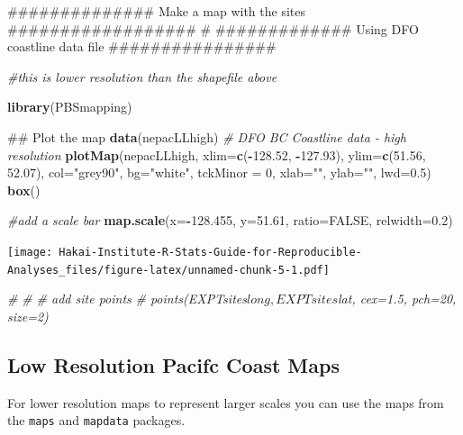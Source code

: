 \documentclass[]{book}
\newenvironment{Shaded}{\begin{snugshade}}{\end{snugshade}}
\newcommand{\KeywordTok}[1]{\textcolor[rgb]{0.13,0.29,0.53}{\textbf{#1}}}
\newcommand{\DataTypeTok}[1]{\textcolor[rgb]{0.13,0.29,0.53}{#1}}
\newcommand{\DecValTok}[1]{\textcolor[rgb]{0.00,0.00,0.81}{#1}}
\newcommand{\FloatTok}[1]{\textcolor[rgb]{0.00,0.00,0.81}{#1}}
\newcommand{\StringTok}[1]{\textcolor[rgb]{0.31,0.60,0.02}{#1}}
\newcommand{\CommentTok}[1]{\textcolor[rgb]{0.56,0.35,0.01}{\textit{#1}}}
\newcommand{\OtherTok}[1]{\textcolor[rgb]{0.56,0.35,0.01}{#1}}
\newcommand{\OperatorTok}[1]{\textcolor[rgb]{0.81,0.36,0.00}{\textbf{#1}}}
\newcommand{\NormalTok}[1]{#1}
\begin{document}
\begin{Shaded}
\begin{Highlighting}[]
\NormalTok{############## Make a map with the sites ################## #}
\NormalTok{############# Using DFO coastline data file ################}

\CommentTok{#this is lower resolution than the shapefile above}

\KeywordTok{library}\NormalTok{(PBSmapping)}

\NormalTok{## Plot the map}
\KeywordTok{data}\NormalTok{(nepacLLhigh)       }\CommentTok{# DFO BC Coastline data - high resolution}
\KeywordTok{plotMap}\NormalTok{(nepacLLhigh, }\DataTypeTok{xlim=}\KeywordTok{c}\NormalTok{(}\OperatorTok{-}\FloatTok{128.52}\NormalTok{, }\OperatorTok{-}\FloatTok{127.93}\NormalTok{), }\DataTypeTok{ylim=}\KeywordTok{c}\NormalTok{(}\FloatTok{51.56}\NormalTok{, }\FloatTok{52.07}\NormalTok{), }\DataTypeTok{col=}\StringTok{"grey90"}\NormalTok{, }\DataTypeTok{bg=}\StringTok{"white"}\NormalTok{, }\DataTypeTok{tckMinor =} \DecValTok{0}\NormalTok{,}
        \DataTypeTok{xlab=}\StringTok{""}\NormalTok{, }\DataTypeTok{ylab=}\StringTok{""}\NormalTok{, }\DataTypeTok{lwd=}\FloatTok{0.5}\NormalTok{)}
\KeywordTok{box}\NormalTok{()}

\CommentTok{#add a scale bar}
\KeywordTok{map.scale}\NormalTok{(}\DataTypeTok{x=}\OperatorTok{-}\FloatTok{128.455}\NormalTok{, }\DataTypeTok{y=}\FloatTok{51.61}\NormalTok{, }\DataTypeTok{ratio=}\OtherTok{FALSE}\NormalTok{, }\DataTypeTok{relwidth=}\FloatTok{0.2}\NormalTok{)}
\end{Highlighting}
\end{Shaded}

\texttt{[image: Hakai-Institute-R-Stats-Guide-for-Reproducible-Analyses\_files/figure-latex/unnamed-chunk-5-1.pdf]}

\begin{Shaded}
\begin{Highlighting}[]
\CommentTok{# }
\CommentTok{# # add site points}
\CommentTok{# points(EXPTsites$long, EXPTsites$lat, cex=1.5, pch=20, size=2)}
\end{Highlighting}
\end{Shaded}

\subsection{Low Resolution Pacifc Coast
Maps}\label{low-resolution-pacifc-coast-maps}

For lower resolution maps to represent larger scales you can use the
maps from the \texttt{maps} and \texttt{mapdata} packages.
\end{document}
